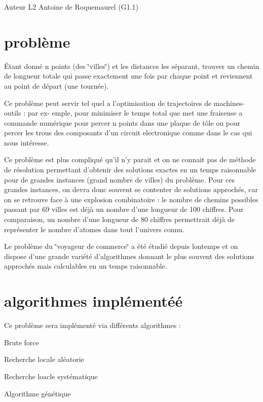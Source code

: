 \begin{DoxyAuthor}{Auteur}
L2 Antoine de Roquemaurel (G1.1)
\end{DoxyAuthor}
\hypertarget{main_Le}{}\section{problème}\label{main_Le}
Étant donné n points (des \char`\"{}villes\char`\"{}) et les distances les séparant, trouver un chemin de longueur totale qui passe exactement une fois par chaque point et reviennent au point de départ (une tournée).

Ce problème peut servir tel quel a l'optimisation de trajectoires de machines-\/outils : par ex-\/ emple, pour minimiser le temps total que met une fraiseuse a commande numérique pour percer n points dans une plaque de tôle ou pour percer les trous des composants d'un circuit electronique comme dans le cas qui nous intéresse.

Ce problème est plus compliqué qu'il n'y parait et on ne connait pas de méthode de résolution permettant d'obtenir des solutions exactes en un temps raisonnable pour de grandes instances (grand nombre de villes) du problème. Pour ces grandes instances, on devra donc souvent se contenter de solutions approchés, car on se retrouve face à une explosion combinatoire : le nombre de chemins possibles passant par 69 villes est déjà un nombre d’une longueur de 100 chiffres. Pour comparaison, un nombre d'une longueur de 80 chiffres permettrait déjà de représenter le nombre d'atomes dans tout l'univers connu.

Le problème du \char`\"{}voyageur de commerce\char`\"{} a été étudié depuis lontemps et on dispose d’une grande variété d'algorithmes donnant le plus souvent des solutions approchés mais calculables en un temps raisonnable.\hypertarget{main_Les}{}\section{algorithmes implémentéé}\label{main_Les}
Ce problème sera implémenté via différents algorithmes :
\begin{DoxyItemize}
\item Brute force
\item Recherche locale aléatorie
\item Recherche loacle systématique
\item Algorithme génétique 
\end{DoxyItemize}
